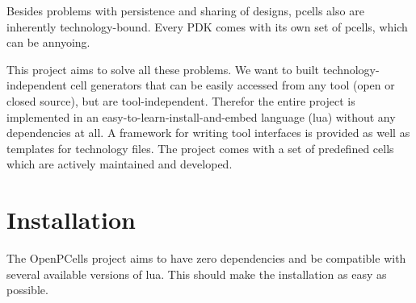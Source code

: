 Besides problems with persistence and sharing of designs, pcells also are inherently technology-bound. Every PDK comes with its own set of pcells, which can be
annyoing.

This project aims to solve all these problems. We want to built technology-independent cell generators that can be easily accessed from any tool (open or closed
source), but are tool-independent. Therefor the entire project is implemented in an easy-to-learn-install-and-embed language (lua) without any dependencies at all. A
framework for writing tool interfaces is provided as well as templates for technology files. The project comes with a set of predefined cells which are actively
maintained and developed.

\section{Installation}
The OpenPCells project aims to have zero dependencies and be compatible with several available versions of lua. This should make the installation as easy as
possible.




